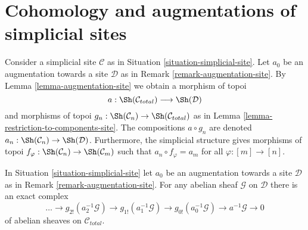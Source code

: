 \section{Cohomology and augmentations of simplicial sites}
\label{section-cohomology-augmentation-simplicial-sites}

\noindent
Consider a simplicial site $\mathcal{C}$ as in
Situation \ref{situation-simplicial-site}.
Let $a_0$ be an augmentation towards a site $\mathcal{D}$ as in
Remark \ref{remark-augmentation-site}.
By Lemma \ref{lemma-augmentation-site} we obtain a morphism of topoi
$$
a : \Sh(\mathcal{C}_{total}) \longrightarrow \Sh(\mathcal{D})
$$
and morphisms of topoi
$g_n : \Sh(\mathcal{C}_n) \to \Sh(\mathcal{C}_{total})$
as in Lemma \ref{lemma-restriction-to-components-site}.
The compositions $a \circ g_n$ are denoted
$a_n : \Sh(\mathcal{C}_n) \to \Sh(\mathcal{D})$.
Furthermore, the simplicial structure gives
morphisms of topoi
$f_\varphi : \Sh(\mathcal{C}_n) \to \Sh(\mathcal{C}_m)$
such that $a_n \circ f_\varphi = a_m$ for all $\varphi : [m] \to [n]$.

\begin{lemma}
\label{lemma-simplicial-resolution-augmentation}
In Situation \ref{situation-simplicial-site} let
$a_0$ be an augmentation towards a site $\mathcal{D}$
as in Remark \ref{remark-augmentation-site}.
For any abelian sheaf $\mathcal{G}$ on $\mathcal{D}$ 
there is an exact complex
$$
\ldots \to
g_{2!}(a_2^{-1}\mathcal{G}) \to
g_{1!}(a_1^{-1}\mathcal{G}) \to
g_{0!}(a_0^{-1}\mathcal{G}) \to
a^{-1}\mathcal{G} \to 0
$$
of abelian sheaves on $\mathcal{C}_{total}$.
\end{lemma}

